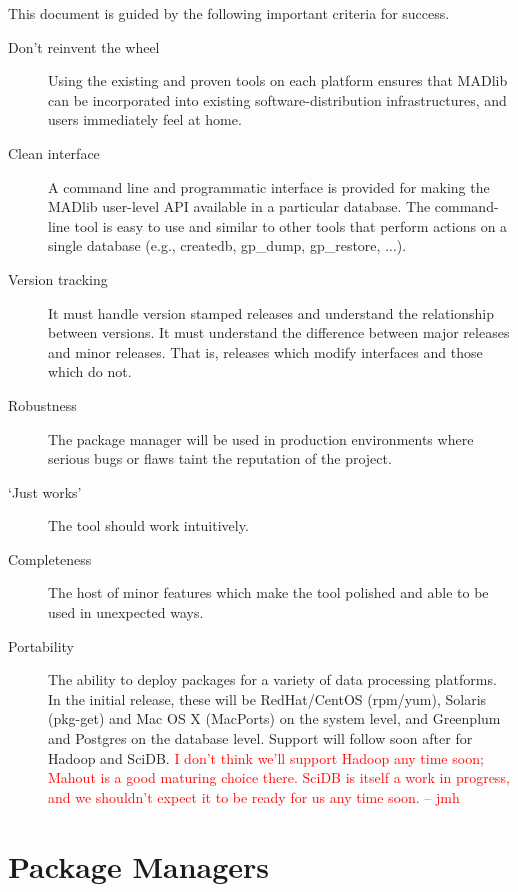 \documentclass[11pt]{article}
\newcommand{\jmh}[1]{{\textcolor{red}{#1 -- jmh}}}
\begin{document}
{This document is guided by the following important criteria for success.

	\begin{description}
		\item[Don't reinvent the wheel]
			Using the existing and proven tools on each platform ensures that MADlib can be incorporated into existing software-distribution infrastructures, and users immediately feel at home.

		\item[Clean interface] A command line and programmatic interface is provided for making the MADlib user-level API available in a particular database. The command-line tool is easy to use and similar to other tools that perform actions on a single database (e.g., createdb, gp\_dump, gp\_restore, ...).

		\item[Version tracking] It must handle version stamped releases and
		understand the relationship between versions. It must understand
		the difference between major releases and minor releases. That is,
		releases which modify interfaces and those which do not.

		\item[Robustness] The package manager will be used in production
		environments where serious bugs or flaws taint the reputation of the
		project.

		\item[`Just works'] The tool should work intuitively.

		\item[Completeness] The host of minor features which make the tool
		polished and able to be used in unexpected ways.

		\item[Portability] The ability to deploy packages for a variety of data processing platforms. In the initial release, these will be RedHat/CentOS (rpm/yum), Solaris (pkg-get) and Mac OS X (MacPorts) on the system level, and Greenplum and Postgres on the database level. Support will follow soon after for Hadoop and SciDB. \jmh{I don't think we'll support Hadoop any time soon; Mahout is a good maturing choice there.  SciDB is itself a work in progress, and we shouldn't expect it to be ready for us any time soon.}

	\end{description}

\section{Package Managers}

}
\end{document}
